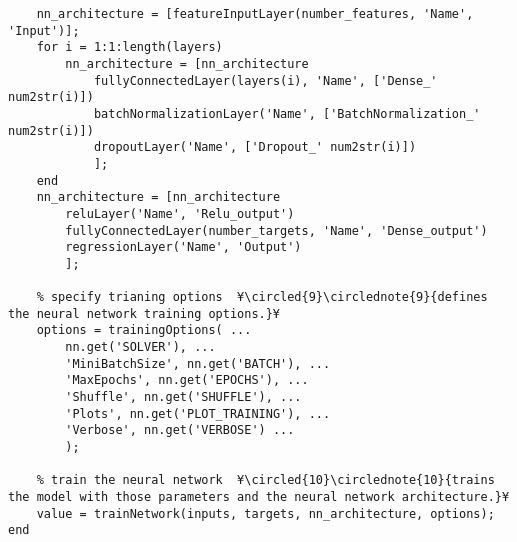 \documentclass{tufte-handout}
\begin{document}
\begin{lstlisting}
    nn_architecture = [featureInputLayer(number_features, 'Name', 'Input')];
    for i = 1:1:length(layers)
        nn_architecture = [nn_architecture
            fullyConnectedLayer(layers(i), 'Name', ['Dense_' num2str(i)])
            batchNormalizationLayer('Name', ['BatchNormalization_' num2str(i)])
            dropoutLayer('Name', ['Dropout_' num2str(i)])
            ];
    end
    nn_architecture = [nn_architecture
        reluLayer('Name', 'Relu_output')
        fullyConnectedLayer(number_targets, 'Name', 'Dense_output')
        regressionLayer('Name', 'Output')
        ];
    
    % specify trianing options  ¥\circled{9}\circlednote{9}{defines the neural network training options.}¥
    options = trainingOptions( ...
        nn.get('SOLVER'), ...
        'MiniBatchSize', nn.get('BATCH'), ...
        'MaxEpochs', nn.get('EPOCHS'), ...
        'Shuffle', nn.get('SHUFFLE'), ...
        'Plots', nn.get('PLOT_TRAINING'), ...
        'Verbose', nn.get('VERBOSE') ...
        );

    % train the neural network  ¥\circled{10}\circlednote{10}{trains the model with those parameters and the neural network architecture.}¥
    value = trainNetwork(inputs, targets, nn_architecture, options);
end

\end{lstlisting}
\end{document}

